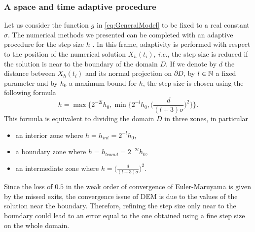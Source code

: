 \subsubsection{A space and time adaptive procedure}\label{sec:Adapt}

Let us consider the function $g$ in \eqref{eq:GeneralModel} to be fixed to a real constant $\sigma$. The numerical methods we presented can be completed with an adaptive procedure for the step size $h$ \cite{Giles2016}. In this frame, adaptivity is performed with respect to the position of the numerical solution $X_h(t_i)$, \textit{i.e.}, the step size is reduced if the solution is near to the boundary of the domain $D$. If we denote by $d$ the distance between $X_h(t_i)$ and its normal projection on $\partial D$, by $l \in \mathbb{N}$ a fixed parameter and by $h_0$ a maximum bound for $h$, the step size is chosen using the following formula \cite{Giles2016}
\begin{equation}\label{eq:Adaptivity}
	h = \max\Big\{ 2^{-2l}h_0, \min\Big\{ 2^{-l}h_0, \Big(\frac{d}{(l + 3)\sigma}\Big)^2\Big\}\Big\}.
\end{equation}
This formula is equivalent to dividing the domain $D$ in three zones, in particular
\begin{itemize}
	\item an interior zone where $h = h_{int} = 2^{-l}h_0$,
	\item a boundary zone where $h = h_{bound} = 2^{-2l}h_0$,
	\item an intermediate zone where $h = \Big(\frac{d}{(l + 3)\sigma}\Big)^2$.
\end{itemize}
Since the loss of $0.5$ in the weak order of convergence of Euler-Maruyama is given by the missed exits, the convergence issue of DEM is due to the values of the solution near the boundary. Therefore, refining the step size only near to the boundary could lead to an error equal to the one obtained using a fine step size on the whole domain.
